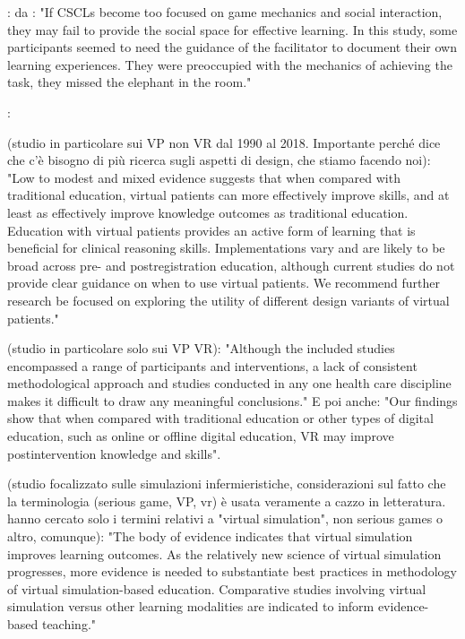 : da \cite{adefila2020students}: "If CSCLs become too focused on game mechanics and social interaction, they may fail to provide the social space for effective learning. In this study, some participants seemed to need the guidance of the facilitator to document
their own learning experiences. They were preoccupied with the mechanics of achieving
the task, they missed the elephant in the room."\par

: 

\cite{kononowicz2019virtual} (studio in particolare sui VP non VR dal 1990 al 2018. Importante perché dice che c'è bisogno di più ricerca sugli aspetti di design, che stiamo facendo noi): "Low to modest and mixed evidence suggests that when compared with traditional education, virtual patients can more effectively improve skills, and at least as effectively improve knowledge outcomes as traditional education. Education with virtual patients provides an active form of learning that is beneficial for clinical reasoning skills. Implementations vary and are likely to be broad across pre- and postregistration education, although current studies do not provide clear guidance on when to use virtual patients. We recommend further research be focused on exploring the utility of different design variants
of virtual patients." 

\cite{kyaw2019virtual} (studio in particolare solo sui VP VR): "Although the included studies encompassed a range of participants and interventions, a lack of consistent methodological approach and studies conducted in any one health care discipline makes it difficult to draw any meaningful conclusions." E poi anche: "Our findings show that when compared with traditional education or other types of digital education, such as online or offline digital education, VR may improve postintervention knowledge and skills".

\cite{foronda2020virtual} (studio focalizzato sulle simulazioni infermieristiche, considerazioni sul fatto che la terminologia (serious game, VP, vr) è usata veramente a cazzo in letteratura. hanno cercato solo i termini relativi a "virtual simulation", non serious games o altro, comunque): "The body of evidence indicates that virtual simulation improves learning outcomes. As the relatively new science of virtual simulation progresses, more evidence is needed to substantiate best practices in methodology of virtual simulation-based education. Comparative studies involving virtual simulation versus other learning modalities are indicated to inform evidence-based teaching." 

